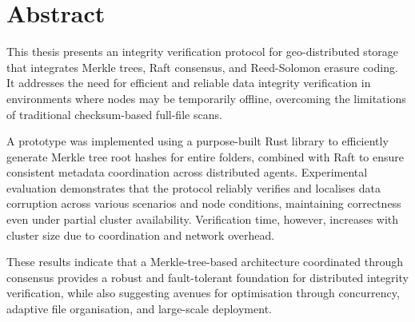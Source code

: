 \shipout\null
\chapter*{Abstract}
\thispagestyle{empty}

This thesis presents an integrity verification protocol for geo-distributed storage that integrates Merkle trees, Raft consensus, and Reed-Solomon erasure coding.
It addresses the need for efficient and reliable data integrity verification in environments where nodes may be temporarily offline, overcoming the limitations of traditional checksum-based full-file scans.

A prototype was implemented using a purpose-built Rust library to efficiently generate Merkle tree root hashes for entire folders, combined with Raft to ensure consistent metadata coordination across distributed agents.
Experimental evaluation demonstrates that the protocol reliably verifies and localises data corruption across various scenarios and node conditions, maintaining correctness even under partial cluster availability.
Verification time, however, increases with cluster size due to coordination and network overhead.

These results indicate that a Merkle-tree-based architecture coordinated through consensus provides a robust and fault-tolerant foundation for distributed integrity verification, while also suggesting avenues for optimisation through concurrency, adaptive file organisation, and large-scale deployment.
